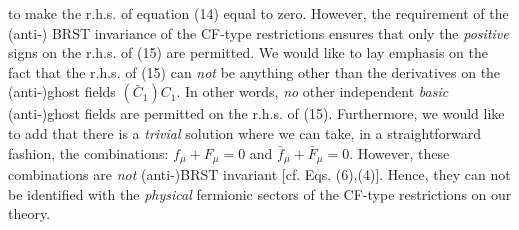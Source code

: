 \documentclass[12pt]{article}
\begin{document}
to make the r.h.s. of equation (14) equal to zero. 
However, the requirement of the (anti-) BRST invariance of the
CF-type restrictions ensures that only the {\it positive} signs on the r.h.s. of (15) are permitted. 
We would like to lay emphasis on the fact  that the r.h.s. of (15) can {\it not} be anything other than the derivatives  
on the (anti-)ghost fields $(\bar C_1)C_1$. In other words, {\it no}  other independent {\it basic} (anti-)ghost 
fields are permitted on the r.h.s. of (15). Furthermore, we would like to add that 
there is a {\it trivial} solution where we can take, in a straightforward fashion, the combinations:
$f_\mu + F_\mu = 0$ and $\bar f_\mu + \bar F_\mu =0$. However, these combinations are {\it not} (anti-)BRST invariant
[cf. Eqs. (6),(4)]. Hence, they can not
be identified with the {\it physical} fermionic sectors of the CF-type restrictions on our theory.
\end{document}
